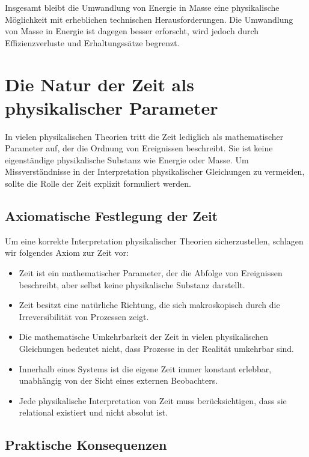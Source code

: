 \documentclass{article}
\begin{document}
Insgesamt bleibt die Umwandlung von Energie in Masse eine physikalische Möglichkeit mit erheblichen technischen Herausforderungen. Die Umwandlung von Masse in Energie ist dagegen besser erforscht, wird jedoch durch Effizienzverluste und Erhaltungssätze begrenzt.


\section{Die Natur der Zeit als physikalischer Parameter}

In vielen physikalischen Theorien tritt die Zeit lediglich als mathematischer Parameter auf, der die Ordnung von Ereignissen beschreibt. Sie ist keine eigenständige physikalische Substanz wie Energie oder Masse. Um Missverständnisse in der Interpretation physikalischer Gleichungen zu vermeiden, sollte die Rolle der Zeit explizit formuliert werden.

\subsection{Axiomatische Festlegung der Zeit}

Um eine korrekte Interpretation physikalischer Theorien sicherzustellen, schlagen wir folgendes Axiom zur Zeit vor:

\begin{itemize}
	\item Zeit ist ein mathematischer Parameter, der die Abfolge von Ereignissen beschreibt, aber selbst keine physikalische Substanz darstellt.
	\item Zeit besitzt eine natürliche Richtung, die sich makroskopisch durch die Irreversibilität von Prozessen zeigt.
	\item Die mathematische Umkehrbarkeit der Zeit in vielen physikalischen Gleichungen bedeutet nicht, dass Prozesse in der Realität umkehrbar sind.
	\item Innerhalb eines Systems ist die eigene Zeit immer konstant erlebbar, unabhängig von der Sicht eines externen Beobachters.
	\item Jede physikalische Interpretation von Zeit muss berücksichtigen, dass sie relational existiert und nicht absolut ist.
\end{itemize}

\subsection{Praktische Konsequenzen}
\end{document}
